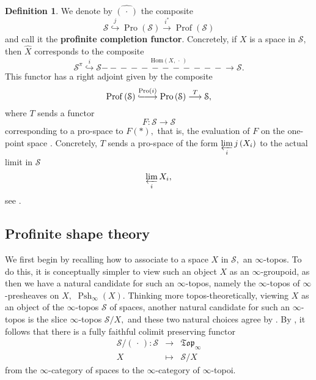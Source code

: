 \documentclass[12pt]{amsart}
\theoremstyle{definition}
\newtheorem{definition}[dummy]{Definition}
\newcommand{\cS}{\mathcal{S}}
\newcommand{\Hom}{\mathrm{Hom}}
\renewcommand{\i}{\infty}
\def\Pro{\operatorname{Pro}}
\def\Pshi{\operatorname{Psh}_\i}
\renewcommand{\lim}{\varprojlim\mspace{3mu}}
\def\blank{\mspace{3mu}\cdot\mspace{3mu}}
\def\Prof{\operatorname{Prof}}
\def\longlongrightarrow{-\!\!\!-\!\!\!-\!\!\!-\!\!\!-\!\!\!-\!\!\!\longrightarrow}
\def\longlonglongrightarrow{-\!\!\!-\!\!\!-\!\!\!-\!\!\!-\!\!\!-\!\!\!\longlongrightarrow}
\newcommand*{\longlonghookrightarrow}{\ensuremath{\lhook\joinrel\relbar\joinrel\relbar\joinrel\rightarrow}}
\begin{document}
\begin{definition}
We denote by $\widehat{\left(\blank\right)}$ the composite
$$\cS \stackrel{j}{\hookrightarrow} \Pro\left(\cS\right) \stackrel{i^*}{\longrightarrow} \Prof\left(\cS\right)$$ and call it the \textbf{profinite completion functor}. Concretely, if
$X$ is a space in $\cS,$ then $\widehat{X}$ corresponds to the composite $$\cS^\pi \stackrel{i}{\hookrightarrow} \cS \stackrel{\Hom\left(X,\blank\right)}{\longlonglongrightarrow} \cS.$$ This functor has a right adjoint given by the composite $$\Prof\left(\cS\right) \stackrel{\Pro\left(i\right)}{\longlonghookrightarrow} \Pro\left(\cS\right) \stackrel{T}{\longrightarrow} \cS,$$ where $T$ sends a functor $$F:\cS \to \cS$$ corresponding to a pro-space to $F\left(*\right),$ that is, the evaluation of $F$ on the one-point space \cite[Proposition 2.8]{knhom}. Concretely, $T$ sends a pro-space of the form $\underset{i} \lim j\left(X_i\right)$ to the actual limit in $\cS$ $$\underset{i} \lim X_i,$$ see \cite[Proposition 2.10]{knhom}.
\end{definition}



\subsection{Profinite shape theory}

We first begin by recalling how to associate to a space $X$ in $\cS,$ an $\i$-topos. To do this, it is conceptually simpler to view such an object $X$ as an $\i$-groupoid, as then we have a natural candidate for such an $\i$-topos, namely the $\i$-topos of $\i$-presheaves on $X,$ $\Pshi\left(X\right).$ Thinking more topos-theoretically, viewing $X$ as an object of the $\i$-topos $\cS$ of spaces, another natural candidate for such an $\i$-topos is the slice $\i$-topos $\cS/X,$ and these two natural choices agree by \cite[Corollary 5.3.5.4]{htt}. By \cite[Remark 6.3.5.10, Theorem 6.3.5.13, and Proposition 6.3.4.1]{htt}, it follows that there is a fully faithful colimit preserving functor
\begin{eqnarray*}
\cS/\left(\mspace{3mu}\cdot\mspace{3mu}\right): \cS &\to& \mathfrak{Top}_\i\\
X &\mapsto& \cS/X
\end{eqnarray*}
from the $\i$-category of spaces to the $\i$-category of $\i$-topoi.
\end{document}
